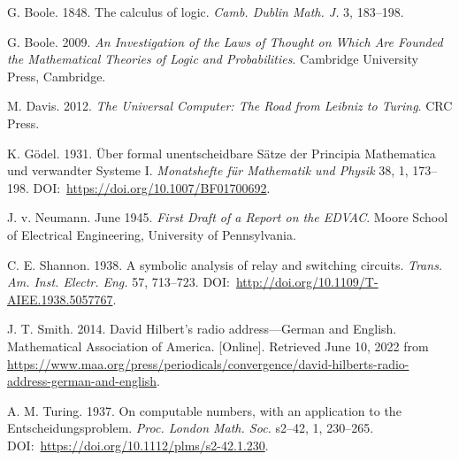 \begin{thebibliography}{}

 G. Boole. 1848. The calculus of logic. \textit{Camb. Dublin Math. J.} 3, 183--198.

G. Boole. 2009. \textit{An Investigation of the Laws of Thought on Which Are Founded the Mathematical Theories of Logic and Probabilities}. Cambridge University Press, Cambridge.

 M. Davis. 2012. \textit{The Universal Computer: The Road from Leibniz to Turing}. CRC Press.

 K. G\"{o}del. 1931. \"{U}ber formal unentscheidbare S\"{a}tze der Principia Mathematica und verwandter Systeme I. \textit{Monatshefte f\"{u}r Mathematik und Physik} 38, 1, 173--198. DOI:~\href{https://doi.org/10.1007/BF01700692}{https://{\allowbreak}doi.{\allowbreak}org/{\allowbreak}10.{\allowbreak}1007/{\allowbreak}BF01700692}.

 J. v. Neumann. June 1945. \textit{First Draft of a Report on the EDVAC}. Moore School of Electrical Engineering, University of Pennsylvania.

 C. E. Shannon. 1938. A symbolic analysis of relay and switching circuits. \textit{Trans. Am. Inst. Electr. Eng.} 57, 713--723. DOI:~\href{http://doi.org/10.1109/T-AIEE.1938.5057767}{http://{\allowbreak}doi.{\allowbreak}org/{\allowbreak}10.{\allowbreak}1109/{\allowbreak}T-{\allowbreak}AIEE.{\allowbreak}1938.{\allowbreak}5057767}.

 J. T. Smith. 2014. David Hilbert's radio address---German and English. Mathematical Association of America. [Online]. Retrieved June 10, 2022 from \href{https://www.maa.org/press/periodicals/convergence/david-hilberts-radio-address-german-and-english}{https://{\allowbreak}www.{\allowbreak}maa.{\allowbreak}org/{\allowbreak}press/{\allowbreak}periodicals/{\allowbreak}convergence/{\allowbreak}david-hilberts-{\allowbreak}radio-{\allowbreak}address-{\allowbreak}german-{\allowbreak}and-english}.

 A. M. Turing. 1937. On computable numbers, with an application to the Entscheidungsproblem. \textit{Proc. London Math. Soc.} s2--42, 1, 230--265. DOI:~\href{https://doi.org/10.1112/plms/s2-42.1.230}{https://{\allowbreak}doi.{\allowbreak}org/{\allowbreak}10.{\allowbreak}1112/{\allowbreak}plms/{\allowbreak}s2-{\allowbreak}42.{\allowbreak}1.230}.
\end{thebibliography}

%

